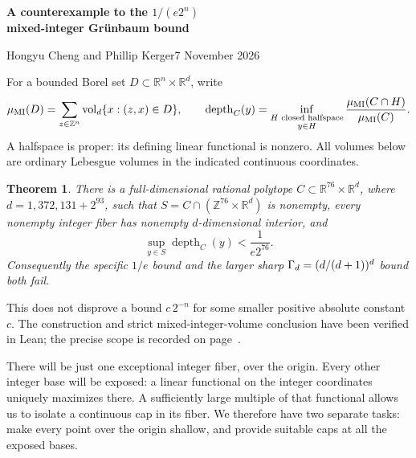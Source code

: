 \documentclass[10pt,letterpaper]{article}
\newtheorem{theorem}{Theorem}
\newcommand{\R}{\mathbb R}\newcommand{\Z}{\mathbb Z}
\newcommand{\MI}{\mu_{\mathrm{MI}}}\newcommand{\depth}{\operatorname{depth}}
\newcommand{\head}[1]{\vspace{5pt}{\large\bfseries\color{ink}#1}\par}
\begin{document}
\thispagestyle{plain}
{\LARGE\bfseries\color{ink}A counterexample to the $1/(e2^n)$\\[3pt]
mixed-integer Gr\"unbaum bound\par}
\vspace{5pt}
{\color{muted}Hongyu Cheng and Phillip Kerger\hfill 7 November 2026}

For a bounded Borel set $D\subset\R^n\times\R^d$, write
\[
 \MI(D)=\sum_{z\in\Z^n}\vol_d\{x:(z,x)\in D\},\qquad
 \depth_C(y)=\inf_{\substack{H\text{ closed halfspace}\\y\in H}}
                    \frac{\MI(C\cap H)}{\MI(C)}.
\]
A halfspace is proper: its defining linear functional is nonzero. All volumes
below are ordinary Lebesgue volumes in the indicated continuous coordinates.

\begin{theorem}\label{thm:main}
There is a full-dimensional rational polytope
$C\subset\R^{76}\times\R^d$, where $d=1{,}372{,}131+2^{93}$, such that
$S=C\cap(\Z^{76}\times\R^d)$ is nonempty, every nonempty integer fiber has
nonempty $d$-dimensional interior, and
\[
                 \sup_{y\in S}\depth_C(y)<\frac{1}{e2^{76}}.
\]
Consequently the specific $1/e$ bound and the larger sharp
$\Gamma_d=(d/(d+1))^d$ bound both fail.
\end{theorem}
This does not disprove a bound $c\,2^{-n}$ for some smaller positive absolute
constant $c$. The construction and strict mixed-integer-volume conclusion
have been verified in Lean; the precise scope is recorded on page~\pageref{sec:formal}.

\head{The idea of the construction}
There will be just one exceptional integer fiber, over the origin. Every
other integer base will be exposed: a linear functional on the integer
coordinates uniquely maximizes there. A sufficiently large multiple of that
functional allows us to isolate a continuous cap in its fiber. We therefore
have two separate tasks: make every point over the origin shallow, and
provide suitable caps at all the exposed bases.
\end{document}
